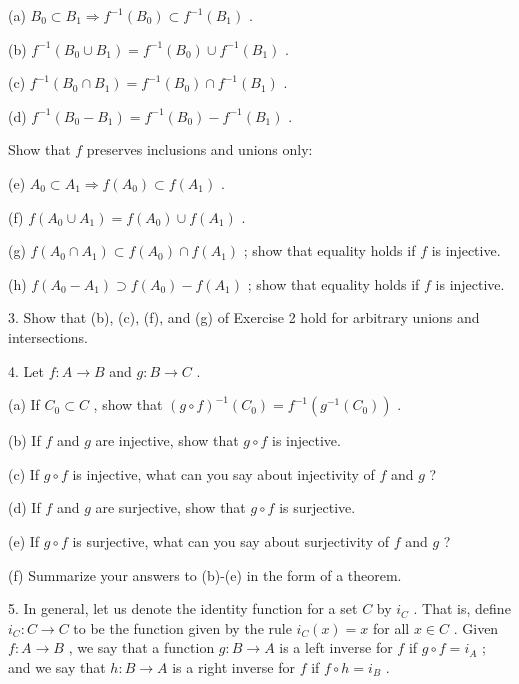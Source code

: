 (a) \({B}_{0} \subset  {B}_{1} \Rightarrow  {f}^{-1}\left( {B}_{0}\right)  \subset  {f}^{-1}\left( {B}_{1}\right)\) .

(b) \({f}^{-1}\left( {{B}_{0} \cup  {B}_{1}}\right)  = {f}^{-1}\left( {B}_{0}\right)  \cup  {f}^{-1}\left( {B}_{1}\right)\) .

(c) \({f}^{-1}\left( {{B}_{0} \cap  {B}_{1}}\right)  = {f}^{-1}\left( {B}_{0}\right)  \cap  {f}^{-1}\left( {B}_{1}\right)\) .

(d) \({f}^{-1}\left( {{B}_{0} - {B}_{1}}\right)  = {f}^{-1}\left( {B}_{0}\right)  - {f}^{-1}\left( {B}_{1}\right)\) .

Show that \(f\) preserves inclusions and unions only:

(e) \({A}_{0} \subset  {A}_{1} \Rightarrow  f\left( {A}_{0}\right)  \subset  f\left( {A}_{1}\right)\) .

(f) \(f\left( {{A}_{0} \cup  {A}_{1}}\right)  = f\left( {A}_{0}\right)  \cup  f\left( {A}_{1}\right)\) .

(g) \(f\left( {{A}_{0} \cap  {A}_{1}}\right)  \subset  f\left( {A}_{0}\right)  \cap  f\left( {A}_{1}\right)\) ; show that equality holds if \(f\) is injective.

(h) \(f\left( {{A}_{0} - {A}_{1}}\right)  \supset  f\left( {A}_{0}\right)  - f\left( {A}_{1}\right)\) ; show that equality holds if \(f\) is injective.

3. Show that (b), (c), (f), and (g) of Exercise 2 hold for arbitrary unions and intersections.

4. Let \(f : A \rightarrow  B\) and \(g : B \rightarrow  C\) .

(a) If \({C}_{0} \subset  C\) , show that \({\left( g \circ  f\right) }^{-1}\left( {C}_{0}\right)  = {f}^{-1}\left( {{g}^{-1}\left( {C}_{0}\right) }\right)\) .

(b) If \(f\) and \(g\) are injective, show that \(g \circ  f\) is injective.

(c) If \(g \circ  f\) is injective, what can you say about injectivity of \(f\) and \(g\) ?

(d) If \(f\) and \(g\) are surjective, show that \(g \circ  f\) is surjective.

(e) If \(g \circ  f\) is surjective, what can you say about surjectivity of \(f\) and \(g\) ?

(f) Summarize your answers to (b)-(e) in the form of a theorem.

5. In general, let us denote the identity function for a set \(C\) by \({i}_{C}\) . That is, define \({i}_{C} : C \rightarrow  C\) to be the function given by the rule \({i}_{C}\left( x\right)  = x\) for all \(x \in  C\) . Given \(f : A \rightarrow  B\) , we say that a function \(g : B \rightarrow  A\) is a left inverse for \(f\) if \(g \circ  f = {i}_{A}\) ; and we say that \(h : B \rightarrow  A\) is a right inverse for \(f\) if \(f \circ  h = {i}_{B}\) .

